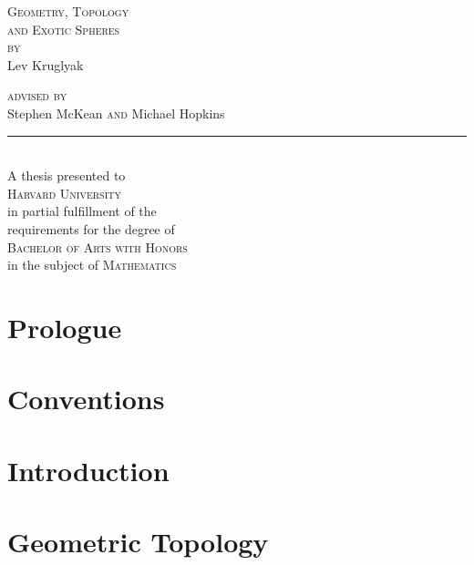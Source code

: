 \documentclass{lkx_thesis}
\begin{document}
\begin{titlepage}
	\begin{center}
		\vfill
		{\HUGE\scshape Geometry, Topology\\ and Exotic Spheres}\\[4em]

		{\Large \scshape by}\\[2em]
		{\huge Lev Kruglyak}\\[3in]

		{
		\Large
		{\scshape advised by\\[1em]}
		{Stephen McKean}
		{\scshape  and}
		{Michael Hopkins}\\[1em]
    \noindent\rule{1in}{0.6pt}\\[1em]
		A thesis presented to \\[1em]
		\textsc{Harvard University}\\[1em]
		in partial fulfillment of the \\
		requirements for the degree of\\[1em]

		\textsc{Bachelor of Arts with Honors}\\
		in the subject of \textsc{Mathematics}
		}
		\vfill
	\end{center}
\end{titlepage}

\lkxtoc

\chapter*{Prologue}\label{chap:prologue}


\chapter*{Conventions}\label{chap:conventions}


\chapter{Introduction}\label{chap:introduction}


\chapter{Geometric Topology}\label{chap:construction}

\end{document}
